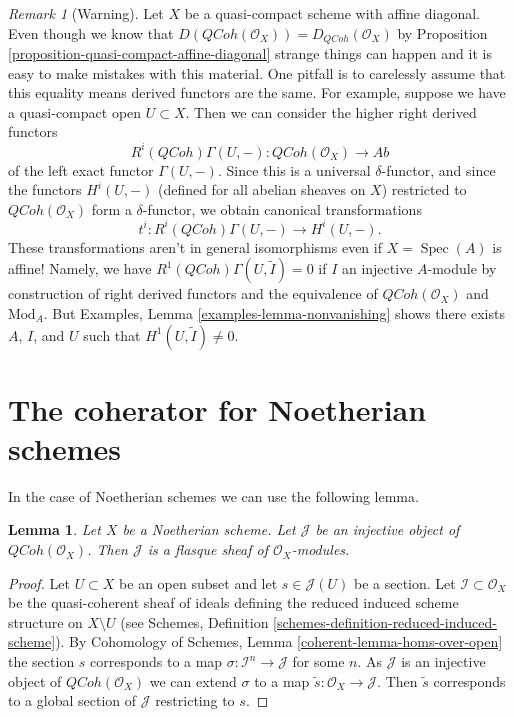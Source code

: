 \documentclass{stacks-project}
\theoremstyle{plain}
\newtheorem{lemma}[subsection]{Lemma}
\theoremstyle{definition}
\theoremstyle{remark}
\newtheorem{remark}[subsection]{Remark}
\numberwithin{equation}{subsection}
\def\Spec{\mathop{\mathrm{Spec}}}
\def\QCoh{\mathit{QCoh}}
\begin{document}
\begin{remark}[Warning]
\label{remark-warning-coherator}
Let $X$ be a quasi-compact scheme with affine diagonal. Even though we know
that $D(\QCoh(\mathcal{O}_X)) = D_\QCoh(\mathcal{O}_X)$ by
Proposition \ref{proposition-quasi-compact-affine-diagonal}
strange things can
happen and it is easy to make mistakes with this material. One pitfall
is to carelessly assume that this equality means derived functors are the same.
For example, suppose we have a quasi-compact open $U \subset X$. Then we can
consider the higher right derived functors
$$
R^i(\QCoh)\Gamma(U, -) : \QCoh(\mathcal{O}_X) \to \textit{Ab}
$$
of the left exact functor $\Gamma(U, -)$. Since this is a universal
$\delta$-functor, and since the functors $H^i(U, -)$ (defined for all
abelian sheaves on $X$) restricted to $\QCoh(\mathcal{O}_X)$ form
a $\delta$-functor, we obtain canonical transformations
$$
t^i : R^i(\QCoh)\Gamma(U, -) \to H^i(U, -).
$$
These transformations aren't in general isomorphisms even if $X = \Spec(A)$
is affine! Namely, we have $R^1(\QCoh)\Gamma(U, \widetilde{I}) = 0$
if $I$ an injective $A$-module by construction of right derived functors
and the equivalence of $\QCoh(\mathcal{O}_X)$ and $\text{Mod}_A$.
But Examples, Lemma \ref{examples-lemma-nonvanishing}
shows there exists $A$, $I$, and $U$ such that
$H^1(U, \widetilde{I}) \not = 0$.
\end{remark}




\section{The coherator for Noetherian schemes}
\label{section-coherator-Noetherian}

\noindent
In the case of Noetherian schemes we can use the following lemma.

\begin{lemma}
\label{lemma-injective-quasi-coherent-sheaf-Noetherian}
Let $X$ be a Noetherian scheme. Let $\mathcal{J}$ be an injective
object of $\QCoh(\mathcal{O}_X)$. Then $\mathcal{J}$
is a flasque sheaf of $\mathcal{O}_X$-modules.
\end{lemma}

\begin{proof}
Let $U \subset X$ be an open subset and let $s \in \mathcal{J}(U)$ be a section.
Let $\mathcal{I} \subset \mathcal{O}_X$ be the quasi-coherent sheaf
of ideals defining the reduced induced scheme structure on $X \setminus U$
(see Schemes, Definition \ref{schemes-definition-reduced-induced-scheme}).
By Cohomology of Schemes, Lemma \ref{coherent-lemma-homs-over-open}
the section $s$ corresponds to a map $\sigma : \mathcal{I}^n \to \mathcal{J}$
for some $n$. As $\mathcal{J}$ is an injective object of
$\QCoh(\mathcal{O}_X)$ we can extend $\sigma$ to a map
$\tilde s : \mathcal{O}_X \to \mathcal{J}$. Then $\tilde s$ corresponds
to a global section of $\mathcal{J}$ restricting to $s$.
\end{proof}
\end{document}
